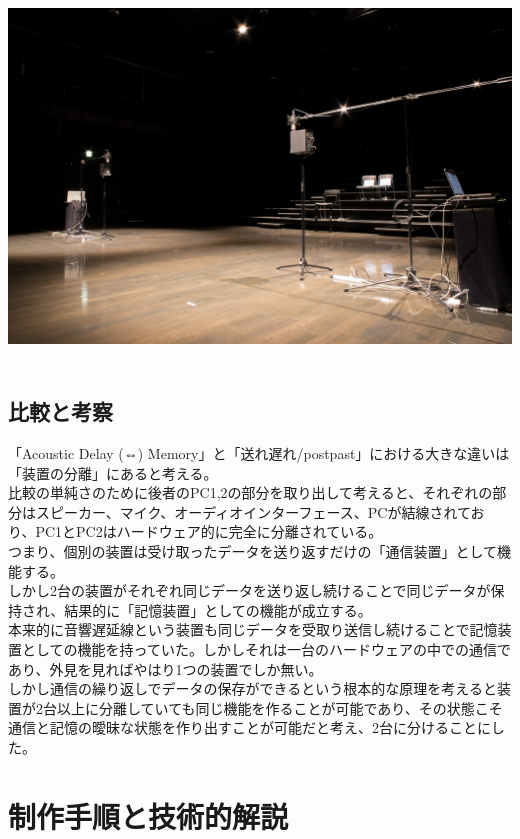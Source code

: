 \includegraphics[width=1.00000\textwidth]{img/postpast1.jpg}~

\section{比較と考察}\label{ux6bd4ux8f03ux3068ux8003ux5bdf}

「Acoustic Delay (⇔)
Memory」と「送れ\textbar{}遅れ/post\textbar{}past」における大きな違いは「装置の分離」にあると考える。\\
比較の単純さのために後者のPC1,2の部分を取り出して考えると、それぞれの部分はスピーカー、マイク、オーディオインターフェース、PCが結線されており、PC1とPC2はハードウェア的に完全に分離されている。\\
つまり、個別の装置は受け取ったデータを送り返すだけの「通信装置」として機能する。\\
しかし2台の装置がそれぞれ同じデータを送り返し続けることで同じデータが保持され、結果的に「記憶装置」としての機能が成立する。\\
本来的に音響遅延線という装置も同じデータを受取り送信し続けることで記憶装置としての機能を持っていた。しかしそれは一台のハードウェアの中での通信であり、外見を見ればやはり1つの装置でしか無い。\\
しかし通信の繰り返しでデータの保存ができるという根本的な原理を考えると装置が2台以上に分離していても同じ機能を作ることが可能であり、その状態こそ通信と記憶の曖昧な状態を作り出すことが可能だと考え、2台に分けることにした。

\chapter{制作手順と技術的解説}\label{ux5236ux4f5cux624bux9806ux3068ux6280ux8853ux7684ux89e3ux8aac}

